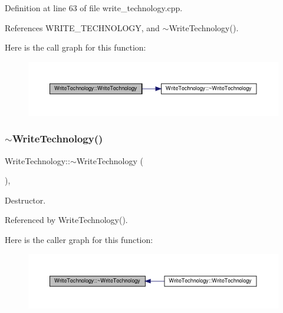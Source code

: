 Definition at line 63 of file write\+\_\+technology.\+cpp.



References W\+R\+I\+T\+E\+\_\+\+T\+E\+C\+H\+N\+O\+L\+O\+GY, and $\sim$\+Write\+Technology().

Here is the call graph for this function\+:
\nopagebreak
\begin{figure}[H]
\begin{center}
\leavevmode
\includegraphics[width=350pt]{d9/dfc/classWriteTechnology_adc37a43fb3949dc14a5cabfb423ec030_cgraph}
\end{center}
\end{figure}
\mbox{\label{classWriteTechnology_ac8820d80a2018e628ce8553fc6cdde8e}} 
\subsubsection{\texorpdfstring{$\sim$\+Write\+Technology()}{~WriteTechnology()}}
{\footnotesize\ttfamily Write\+Technology\+::$\sim$\+Write\+Technology (\begin{DoxyParamCaption}{ }\end{DoxyParamCaption})\hspace{0.3cm}{\ttfamily [override]}, {\ttfamily [default]}}



Destructor. 



Referenced by Write\+Technology().

Here is the caller graph for this function\+:
\nopagebreak
\begin{figure}[H]
\begin{center}
\leavevmode
\includegraphics[width=350pt]{d9/dfc/classWriteTechnology_ac8820d80a2018e628ce8553fc6cdde8e_icgraph}
\end{center}
\end{figure}


